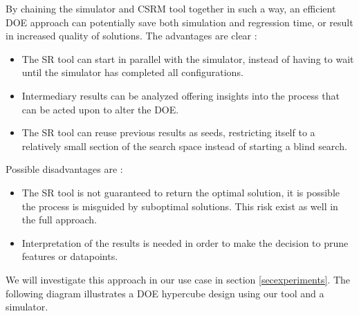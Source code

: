 By chaining the simulator and CSRM tool together in such a way, an efficient DOE approach can potentially save both simulation and regression time, or result in increased quality of solutions.
The advantages are clear :
\begin{itemize}
\item The SR tool can start in parallel with the simulator, instead of having to wait until the simulator has completed all configurations.
\item Intermediary results can be analyzed offering insights into the process that can be acted upon to alter the DOE.
\item The SR tool can reuse previous results as seeds, restricting itself to a relatively small section of the search space instead of starting a blind search.
\end{itemize}
Possible disadvantages are :
\begin{itemize}
\item The SR tool is not guaranteed to return the optimal solution, it is possible the process is misguided by suboptimal solutions. This risk exist as well in the full approach.
\item Interpretation of the results is needed in order to make the decision to prune features or datapoints.
\end{itemize}
We will investigate this approach in our use case in  section \ref{secexperiments}.
The following diagram illustrates a DOE hypercube design using our tool and a simulator. \\
